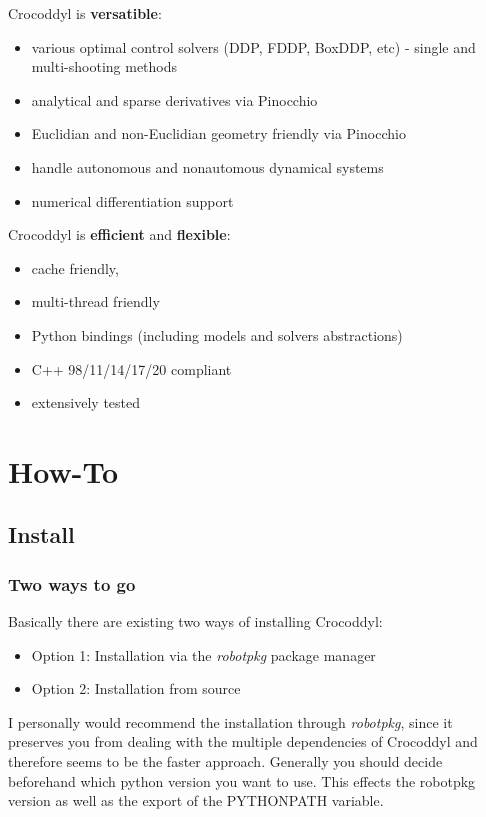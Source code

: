 Crocoddyl is \textbf{versatible}:
\begin{itemize}
\item various optimal control solvers (DDP, FDDP, BoxDDP, etc) - single and multi-shooting methods
\item analytical and sparse derivatives via Pinocchio
\item Euclidian and non-Euclidian geometry friendly via Pinocchio
\item handle autonomous and nonautomous dynamical systems
\item numerical differentiation support
\end{itemize}

Crocoddyl is \textbf{efficient} and \textbf{flexible}:
\begin{itemize}
\item cache friendly,
\item multi-thread friendly
\item Python bindings (including models and solvers abstractions)
\item C++ 98/11/14/17/20 compliant
\item extensively tested
\end{itemize}


\section{How-To}
\subsection{Install}
\subsubsection{Two ways to go}
Basically there are existing two ways of installing Crocoddyl: 
\begin{itemize}
\item Option 1: Installation via the \textit{robotpkg } package manager
\item Option 2: Installation from source
\end{itemize} 
I personally would recommend the installation through \textit{robotpkg}, since it preserves you from dealing with the multiple dependencies of Crocoddyl and therefore seems to be the faster approach. Generally you should decide beforehand which python version you want to use. This effects the robotpkg version as well as the export of the PYTHONPATH variable. 

